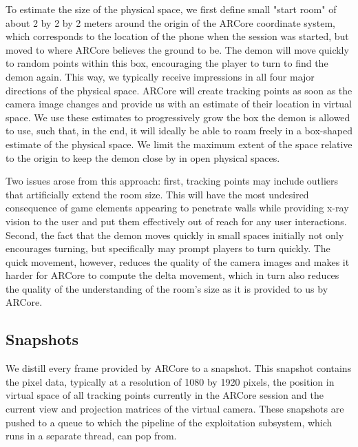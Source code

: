 To estimate the size of the physical space, we first define small "start room" of about 2 by 2 by 2 meters around the origin of the ARCore coordinate system, which corresponds to the location of the phone when the session was started, but moved to where ARCore believes the ground to be.
The demon will move quickly to random points within this box, encouraging the player to turn to find the demon again.
This way, we typically receive impressions in all four major directions of the physical space.
ARCore will create tracking points as soon as the camera image changes and provide us with an estimate of their location in virtual space.
We use these estimates to progressively grow the box the demon is allowed to use, such that, in the end, it will ideally be able to roam freely in a box-shaped estimate of the physical space.
We limit the maximum extent of the space relative to the origin to keep the demon close by in open physical spaces.

Two issues arose from this approach: first, tracking points may include outliers that artificially extend the room size.
This will have the most undesired consequence of game elements appearing to penetrate walls while providing x-ray vision to the user and put them effectively out of reach for any user interactions.
Second, the fact that the demon moves quickly in small spaces initially not only encourages turning, but specifically may prompt players to turn quickly.
The quick movement, however, reduces the quality of the camera images and makes it harder for ARCore to compute the delta movement, which in turn also reduces the quality of the understanding of the room's size as it is provided to us by ARCore.

\subsection{Snapshots}
We distill every frame provided by ARCore to a snapshot.
This snapshot contains the pixel data, typically at a resolution of 1080 by 1920 pixels, the position in virtual space of all tracking points currently in the ARCore session and the current view and projection matrices of the virtual camera.
These snapshots are pushed to a queue to which the pipeline of the exploitation subsystem, which runs in a separate thread, can pop from.

